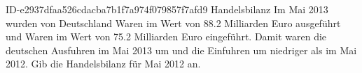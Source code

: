 \begin{exercise}
      {ID-e2937dfaa526cdacba7b1f7a974f079857f7afd9}
      {Handelsbilanz}
  \ifproblem\problem
    Im Mai 2013 wurden von Deutschland Waren im Wert von \num{88.2} Milliarden
    Euro ausgeführt und Waren im Wert von \num{75.2} Milliarden Euro eingeführt.
    Damit waren die deutschen Ausfuhren im Mai 2013 um  und die
    Einfuhren um  niedriger als im Mai 2012. Gib die Handelsbilanz
    für Mai 2012 an.
  \fi
\end{exercise}
